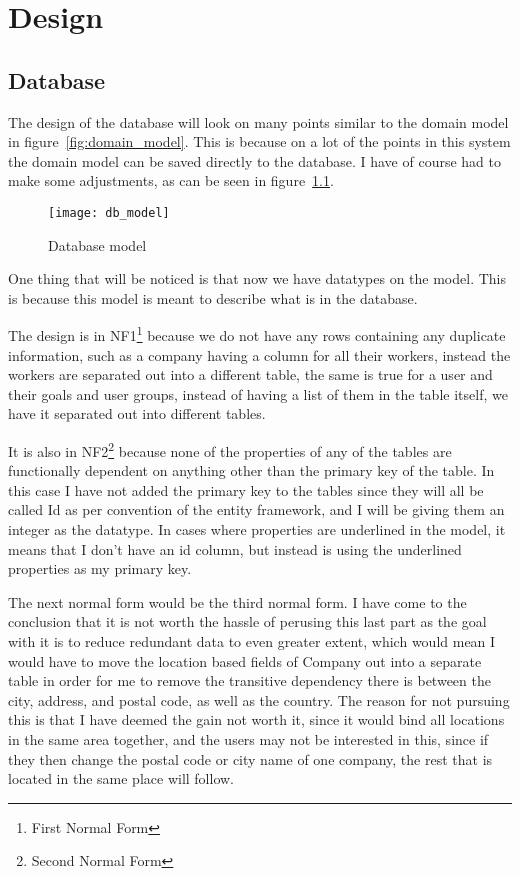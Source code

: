 \chapter{Design}
\label{chap:Design}

\section{Database}
\label{sec:Database}
The design of the database will look on many points similar to the domain model in figure~\ref{fig:domain_model}. This is because on a lot of the points in this system the domain model can be saved directly to the database. I have of course had to make some adjustments, as can be seen in figure~\ref{fig:Database model}.

\begin{figure}[h]
  \texttt{[image: db\_model]}
  \caption{Database model}
  \label{fig:Database model}
\end{figure}

One thing that will be noticed is that now we have datatypes on the model. This is because this model is meant to describe what is in the database.

The design is in NF1\footnote{First Normal Form} because we do not have any rows containing any duplicate information, such as a company having a column for all their workers, instead the workers are separated out into a different table\cite[p.~430]{DB_systems}, the same is true for a user and their goals and user groups, instead of having a list of them in the table itself, we have it separated out into different tables.

It is also in NF2\footnote{Second Normal Form} because none of the properties of any of the tables are functionally dependent on anything other than the primary key of the table\cite[p.~434]{DB_systems}. In this case I have not added the primary key to the tables since they will all be called Id as per convention of the entity framework, and I will be giving them an integer as the datatype. In cases where properties are underlined in the model, it means that I don't have an id column, but instead is using the underlined properties as my primary key.

The next normal form would be the third normal form. I have come to the conclusion that it is not worth the hassle of perusing this last part as the goal with it is to reduce redundant data to even greater extent, which would mean I would have to move the location based fields of Company out into a separate table in order for me to remove the transitive dependency\cite[p.~436]{DB_systems} there is between the city, address, and postal code, as well as the country. The reason for not pursuing this is that I have deemed the gain not worth it, since it would bind all locations in the same area together, and the users may not be interested in this, since if they then change the postal code or city name of one company, the rest that is located in the same place will follow.

